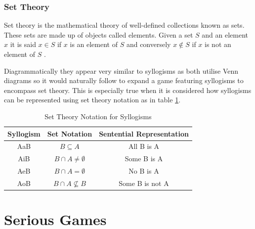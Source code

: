 \documentclass[12pt,a4paper]{report}
\begin{document}
\subsubsection{Set Theory}
Set theory is the mathematical theory of well-defined collections known as sets. These sets are made up of objects called elements. Given a set $S$ and an element $x$ it is said $x \in S$ if $x$ is an element of $S$ and conversely $x \notin S$ if $x$ is not an element of $S$ \citep{sep-set-theory}.

Diagrammatically they appear very similar to syllogisms as both utilise Venn diagrams so it would naturally follow to expand a game featuring syllogisms to encompass set theory. This is especially true when it is considered how syllogisms can be represented using set theory notation as in table \ref{tbl:setTheoryNotationTable}.
 
\begin{table}[h!]
\begin{center}
  \begin{tabular}{ c | c | c }
    Syllogism & Set Notation & Sentential Representation \\ \hline
    AaB & $B \subseteq A$ & All B is A \\
    AiB & $B \cap A \neq \emptyset$ & Some B is A \\
    AeB & $B \cap A = \emptyset$ & No B is A \\
    AoB & $B \cap A \nsubseteq B$ & Some B is not A \\
  \end{tabular}
   \caption{Set Theory Notation for Syllogisms}
  \label{tbl:setTheoryNotationTable}
\end{center}
\end{table}


\section{Serious Games}
\end{document}
